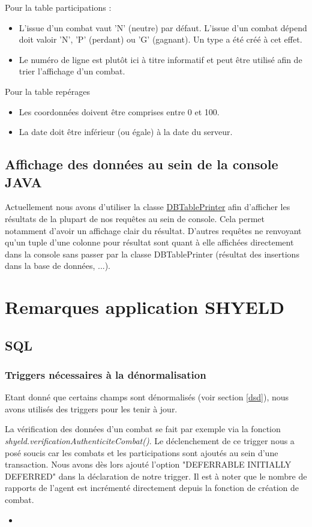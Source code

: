 \documentclass{article}[12pt]
\newcommand{\SQLcode}[2]{
	\begin{itemize}
		\item[]
	\end{itemize}
}
\begin{document}
	Pour la table participations :
	\begin{itemize}
		\item L'issue d'un combat vaut 'N' (neutre) par défaut. L'issue d'un combat dépend doit valoir 'N', 'P' (perdant) ou 'G' (gagnant). Un type a été créé à cet effet.
		\item Le numéro de ligne est plutôt ici à titre informatif et peut être utilisé afin de trier l'affichage d'un combat.
	\end{itemize}
	Pour la table repérages
	\begin{itemize}
		\item Les coordonnées doivent être comprises entre 0 et 100.
		\item La date doit être inférieur (ou égale) à la date du serveur.
	\end{itemize}
	\subsection{Affichage des données au sein de la console JAVA}
	Actuellement nous avons d'utiliser la classe \href{https://github.com/htorun/dbtableprinter}{DBTablePrinter} afin d'afficher les résultats de la plupart de nos requêtes au sein de console. Cela permet notamment d'avoir un affichage clair du résultat. D'autres requêtes ne renvoyant qu'un tuple d'une colonne pour résultat sont quant à elle affichées directement dans la console sans passer par la classe DBTablePrinter (résultat des insertions dans la base de données, ...). 
	\section{Remarques application SHYELD}
	\label{shyield}
	\subsection{SQL}
	
	\subsubsection{Triggers nécessaires à la dénormalisation}
	
	Etant donné que certains champs sont dénormalisés (voir section \ref{dsd}), nous avons utilisés des triggers pour les tenir à jour.
	
	La vérification des données d'un combat se fait par exemple via la fonction \textit{shyeld.verificationAuthenticiteCombat()}. Le déclenchement de ce trigger nous a posé soucis car les combats et les participations sont ajoutés au sein d'une transaction. Nous avons dès lors ajouté l'option "DEFERRABLE INITIALLY DEFERRED" dans la déclaration de notre trigger. Il est à noter que le nombre de rapports de l'agent est incrémenté directement depuis la fonction de création de combat.
	\SQLcode{triggerCombat}{Trigger de vérification d'un combat}
	
\end{document}
